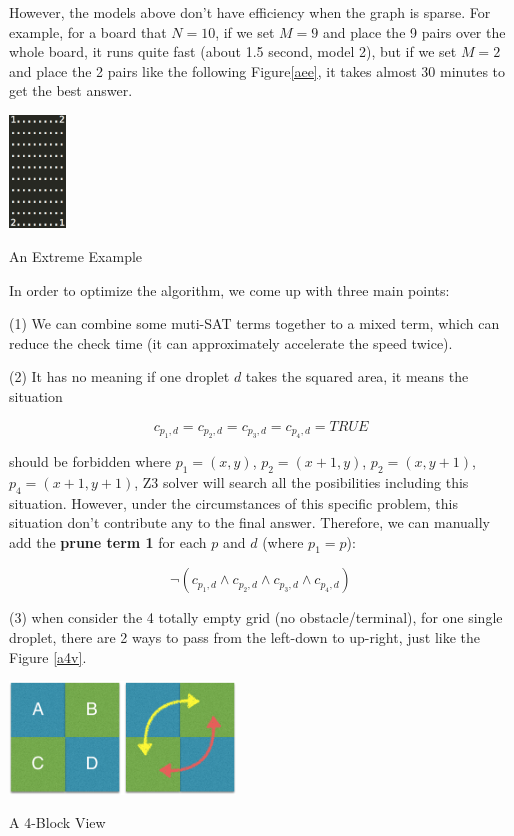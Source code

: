 \documentclass[twocolumn]{article}
\begin{document}
However, the models above don't have efficiency when the graph is sparse. For example, for a board that $N=10$, if we set $M=9$ and place the 9 pairs over the whole board, it runs quite fast (about 1.5 second, model 2), but if we set $M=2$ and place the 2 pairs like the following Figure\ref{aee}, it takes almost 30 minutes to get the best answer.

\begin{center}
\makeatletter
\def\@captype{figure}
\makeatother
\includegraphics [height=3cm]{example}
\caption{An Extreme Example}
\label{aee}
\end{center}

In order to optimize the algorithm, we come up with three main points:

(1) We can combine some muti-SAT terms together to a mixed term, which can reduce the check time (it can approximately accelerate the speed twice).

(2) It has no meaning if one droplet $d$ takes the squared area, it means the situation

\[
c_{p_1, d} = c_{p_2, d} = c_{p_3, d} = c_{p_4, d} = TRUE
\]

should be forbidden where $p_1 = (x, y)$, $p_2 = (x + 1, y)$, $p_2 = (x, y + 1)$, $p_4 = (x + 1, y + 1)$, Z3 solver will search all the posibilities including this situation. However, under the circumstances of this specific problem, this situation don't contribute any to the final answer. Therefore, we can manually add the \textbf{prune term 1} for each $p$ and $d$ (where $p_1 = p$):

\[
\neg(c_{p_1, d} \wedge c_{p_2, d} \wedge c_{p_3, d} \wedge c_{p_4, d})
\]

(3) when consider the 4 totally empty grid (no obstacle/terminal), for one single droplet, there are 2 ways to pass from the left-down to up-right, just like the Figure \ref{a4v}.

\begin{center}
\makeatletter
\def\@captype{figure}
\makeatother
\includegraphics [height=3cm]{example2}
\caption{A 4-Block View}
\label{a4v}
\end{center}
\end{document}
